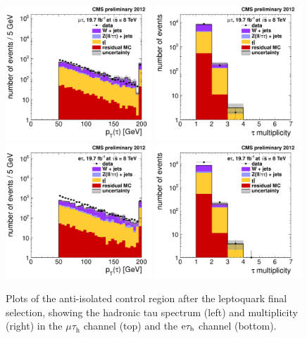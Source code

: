 \documentclass[12pt]{thesis}  %
\newcommand{\tauh}{\ensuremath{\tau_{\text{h}}}\xspace}
\newcommand{\Pe}{\ensuremath{\cmsSymbolFace{e}}\xspace}
\newcommand{\mutau}{\ensuremath{\mu\tauh}\xspace}
\newcommand{\etau}{\ensuremath{\Pe\tauh}\xspace}
\begin{document}
\begin{figure}[hbtp]
  \begin{center}
    \includegraphics[width=0.49\textwidth]{figures/bkgEstim/pttauantiisoall_mutau.pdf}
    \includegraphics[width=0.49\textwidth]{figures/bkgEstim/ntauantiiso_mutau.pdf} \\
    \includegraphics[width=0.49\textwidth]{figures/bkgEstim/pttauantiisoall_etau.pdf}
    \includegraphics[width=0.49\textwidth]{figures/bkgEstim/ntauantiiso_etau.pdf} 
    \caption{Plots of the anti-isolated control region after the leptoquark final selection, showing the hadronic tau \pt spectrum (left) and multiplicity (right) in the \mutau channel (top) and the \etau channel (bottom). \label{Bkg:fig:antiiso}}
  \end{center}
\end{figure}
\end{document}
